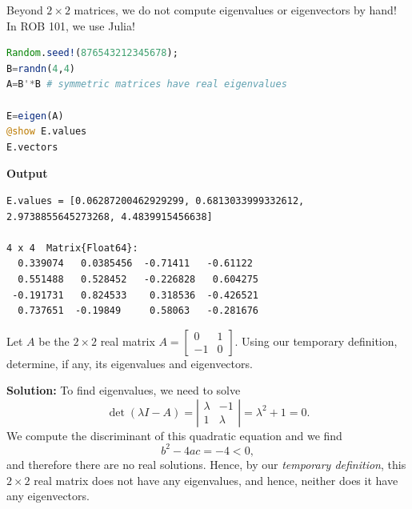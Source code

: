 \begin{tcolorbox}[title=\textbf{\Large Finding Eigenvectors and Eigenvalues with Julia}]
Beyond $2 \times 2$ matrices, we do not compute eigenvalues or eigenvectors by hand! In ROB 101, we use Julia!

\begin{lstlisting}[language=Julia,style=mystyle]
Random.seed!(876543212345678);
B=randn(4,4)
A=B'*B # symmetric matrices have real eigenvalues

E=eigen(A)
@show E.values
E.vectors
\end{lstlisting} 
\end{tcolorbox}
\textbf{Output} 
\begin{verbatim}
E.values = [0.06287200462929299, 0.6813033999332612, 2.9738855645273268, 4.4839915456638]

4 x 4  Matrix{Float64}:
  0.339074   0.0385456  -0.71411   -0.61122
  0.551488   0.528452   -0.226828   0.604275
 -0.191731   0.824533    0.318536  -0.426521
  0.737651  -0.19849     0.58063   -0.281676
\end{verbatim}


\vspace*{.3cm}
    
    
\begin{example}
\label{ex:Chapt10EigenComplex} Let $A$ be the $2 \times 2$ real matrix
 $A=\left[\begin{array}{rr}
    0 & 1\\
    -1 & 0
    \end{array}\right].$
Using our temporary definition, determine, if any, its eigenvalues and eigenvectors. 
\end{example}

\textbf{Solution:} To find eigenvalues, we need to solve 
$$\det(\lambda I-A)= \left| \begin{array}{rr}
    \lambda & -1\\
    1 &\lambda
    \end{array} \right| =\lambda^2+1=0.$$
    We compute the discriminant of this quadratic equation and we find
    $$b^2-4ac = -4 <0,$$
    and therefore there are no real solutions. Hence, by our \textit{temporary definition}, this $2 \times 2$ real matrix does not have any eigenvalues, and hence, neither does it have any eigenvectors.\\
\Qed
\vspace*{.5cm}

